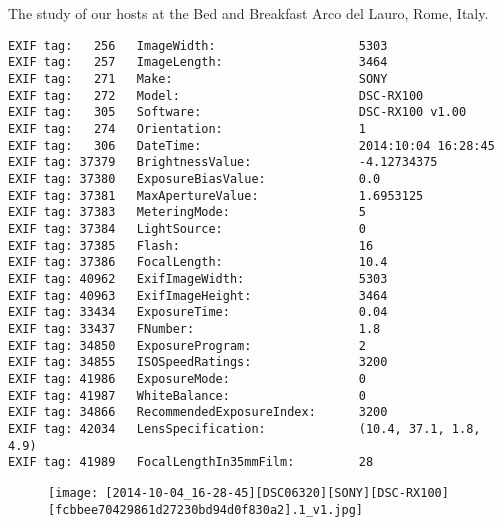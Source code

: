 \section{\protect{}}
\noindent The study of our hosts at the Bed and Breakfast Arco del Lauro, Rome, Italy.
\noindent
\begin{lstlisting}
EXIF tag:   256   ImageWidth:                    5303
EXIF tag:   257   ImageLength:                   3464
EXIF tag:   271   Make:                          SONY
EXIF tag:   272   Model:                         DSC-RX100
EXIF tag:   305   Software:                      DSC-RX100 v1.00
EXIF tag:   274   Orientation:                   1
EXIF tag:   306   DateTime:                      2014:10:04 16:28:45
EXIF tag: 37379   BrightnessValue:               -4.12734375
EXIF tag: 37380   ExposureBiasValue:             0.0
EXIF tag: 37381   MaxApertureValue:              1.6953125
EXIF tag: 37383   MeteringMode:                  5
EXIF tag: 37384   LightSource:                   0
EXIF tag: 37385   Flash:                         16
EXIF tag: 37386   FocalLength:                   10.4
EXIF tag: 40962   ExifImageWidth:                5303
EXIF tag: 40963   ExifImageHeight:               3464
EXIF tag: 33434   ExposureTime:                  0.04
EXIF tag: 33437   FNumber:                       1.8
EXIF tag: 34850   ExposureProgram:               2
EXIF tag: 34855   ISOSpeedRatings:               3200
EXIF tag: 41986   ExposureMode:                  0
EXIF tag: 41987   WhiteBalance:                  0
EXIF tag: 34866   RecommendedExposureIndex:      3200
EXIF tag: 42034   LensSpecification:             (10.4, 37.1, 1.8, 4.9)
EXIF tag: 41989   FocalLengthIn35mmFilm:         28

\end{lstlisting}
\clearpage
\begin{figure}
\raggedleft
\texttt{[image: [2014-10-04\_16-28-45][DSC06320][SONY][DSC-RX100][fcbbee70429861d27230bd94d0f830a2].1\_v1.jpg]}
\end{figure}


\clearpage
